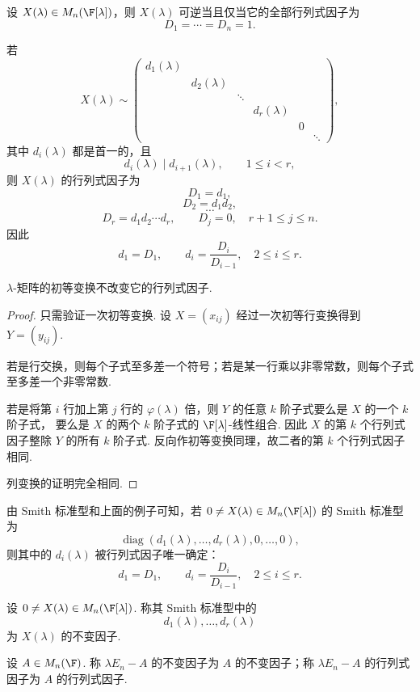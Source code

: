 \begin{example}
	设 $X(\lambda)\in M_n(\F[\lambda])$，则 $X(\lambda)$ 可逆当且仅当它的全部行列式因子为
	\[
	D_1=\cdots=D_n=1.
	\]
\end{example}

\begin{example}
	若
	\[
	X(\lambda)\sim
	\begin{pmatrix}
		d_1(\lambda) \\
		& d_2(\lambda) \\
		&& \ddots \\
		&&& d_r(\lambda) \\
		&&&& 0 \\
		&&&&& \ddots
	\end{pmatrix},
	\]
	其中 $d_i(\lambda)$ 都是首一的，且
	\[
	d_i(\lambda)\mid d_{i+1}(\lambda),\qquad 1\leq i<r,
	\]
	则 $X(\lambda)$ 的行列式因子为
	\[
	D_1=d_1,
	\]
	\[
	D_2=d_1d_2,
	\]
	\[
	\cdots
	\]
	\[
	D_r=d_1d_2\cdots d_r,
	\qquad
	D_j=0,\quad r+1\leq j\leq n.
	\]
	因此
	\[
	d_1=D_1,
	\qquad
	d_i=\frac{D_i}{D_{i-1}},\quad 2\leq i\leq r.
	\]
\end{example}

\begin{lemma}
	$\lambda$-矩阵的初等变换不改变它的行列式因子.
\end{lemma}

\begin{proof}
	只需验证一次初等变换. 设 $X=(x_{ij})$ 经过一次初等行变换得到 $Y=(y_{ij})$.
	
	若是行交换，则每个子式至多差一个符号；若是某一行乘以非零常数，则每个子式至多差一个非零常数.
	
	若是将第 $i$ 行加上第 $j$ 行的 $\varphi(\lambda)$ 倍，则 $Y$ 的任意 $k$ 阶子式要么是 $X$ 的一个 $k$ 阶子式，
	要么是 $X$ 的两个 $k$ 阶子式的 $\F[\lambda]$-线性组合. 因此 $X$ 的第 $k$ 个行列式因子整除 $Y$ 的所有 $k$ 阶子式.
	反向作初等变换同理，故二者的第 $k$ 个行列式因子相同.
	
	列变换的证明完全相同.
\end{proof}


由 Smith 标准型和上面的例子可知，若 $0\neq X(\lambda)\in M_n(\F[\lambda])$ 的 Smith 标准型为
\[
\operatorname{diag}(d_1(\lambda),\ldots,d_r(\lambda),0,\ldots,0),
\]
则其中的 $d_i(\lambda)$ 被行列式因子唯一确定：
\[
d_1=D_1,
\qquad
d_i=\frac{D_i}{D_{i-1}},\quad 2\leq i\leq r.
\]

\begin{definition}\label{p1:concept:c5-l2373}
	设 $0\neq X(\lambda)\in M_n(\F[\lambda])$. 称其 Smith 标准型中的
	\[
	d_1(\lambda),\ldots,d_r(\lambda)
	\]
	为 $X(\lambda)$ 的不变因子.
	
	设 $A\in M_n(\F)$. 称 $\lambda E_n-A$ 的不变因子为 $A$ 的不变因子；称 $\lambda E_n-A$ 的行列式因子为 $A$ 的行列式因子.
\end{definition}

